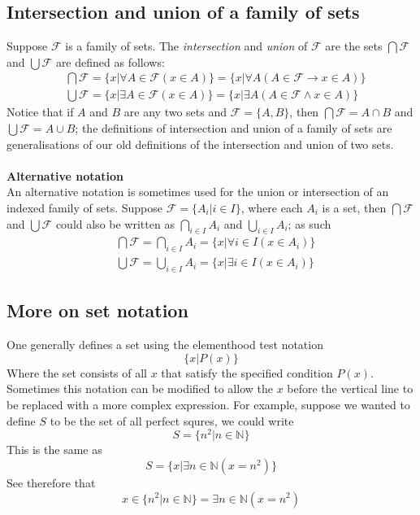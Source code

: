 \documentclass{report}
\begin{document}
\subsection{Intersection and union of a family of sets}
Suppose $\mathcal{F}$ is a family of sets. The \textit{intersection} and \textit{union} of $\mathcal{F}$ are the sets $\bigcap\mathcal{F}$ and $\bigcup\mathcal{F}$ are defined as follows:
\begin{align*}
&\bigcap\mathcal F=\{x|\forall A\in\mathcal F(x\in A)\}=\{x|\forall A(A\in\mathcal F\to x\in A)\}\\
&\bigcup\mathcal F=\{x|\exists A\in\mathcal F(x\in A)\}=\{x|\exists A(A\in\mathcal F\land x\in A)\}
\end{align*}
Notice that if $A$ and $B$ are any two sets and $\mathcal F=\{A,B\}$, then $\bigcap\mathcal F=A\cap B$ and $\bigcup\mathcal F=A\cup B$; the definitions of intersection and union of a family of sets
are generalisations of our old definitions of the intersection and union of two sets.\\
\vspace{1mm}\\
\textbf{Alternative notation}\\
An alternative notation is sometimes used for the union or intersection of an indexed family of sets. Suppose $\mathcal F=\{A_i|i\in I\}$, where each $A_i$ is a set,
then $\bigcap\mathcal F$ and $\bigcup\mathcal F$ could also be written as 
$\bigcap_{i\in I}A_i$ and $\bigcup_{i\in I}A_i$; as such
\begin{align*}
&\bigcap\mathcal F=\bigcap_{i\in I}A_i=\{x|\forall i\in I(x\in A_i)\}\\
&\bigcup\mathcal F=\bigcup_{i\in I}A_i=\{x|\exists i\in I(x\in A_i)\}
\end{align*}
\newpage

\subsection{More on set notation}
One generally defines a set using the elementhood test notation
\begin{equation*}
\{x|P(x)\}
\end{equation*}
Where the set consists of all $x$ that satisfy the specified condition $P(x)$. Sometimes this notation can be modified to allow the $x$ before the vertical line to be replaced
with a more complex expression. For example, suppose we wanted to define $S$ to be the set of all
perfect squres, we could write
\begin{equation*}
S=\{n^2|n\in\mathbb{N}\}
\end{equation*}
This is the same as
\begin{equation*}
S=\{x|\exists n\in\mathbb N(x=n^2)\}
\end{equation*}
See therefore that 
\begin{equation*}
x\in\{n^2|n\in\mathbb{N}\}=\exists n\in\mathbb N(x=n^2)
\end{equation*}
\end{document}
